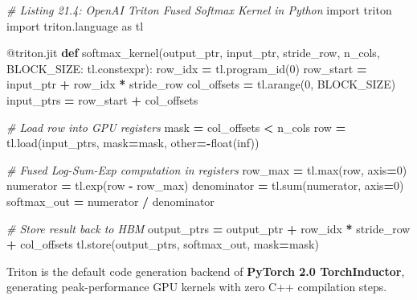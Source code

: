 \documentclass[
  letterpaper,
]{scrbook}
\newenvironment{Shaded}{\begin{snugshade}}{\end{snugshade}}
\newcommand{\AttributeTok}[1]{\textcolor[rgb]{0.13,0.29,0.53}{#1}}
\newcommand{\BuiltInTok}[1]{#1}
\newcommand{\CommentTok}[1]{\textcolor[rgb]{0.56,0.35,0.01}{\textit{#1}}}
\newcommand{\DecValTok}[1]{\textcolor[rgb]{0.00,0.00,0.81}{#1}}
\newcommand{\ImportTok}[1]{#1}
\newcommand{\KeywordTok}[1]{\textcolor[rgb]{0.13,0.29,0.53}{\textbf{#1}}}
\newcommand{\NormalTok}[1]{#1}
\newcommand{\OperatorTok}[1]{\textcolor[rgb]{0.81,0.36,0.00}{\textbf{#1}}}
\newcommand{\StringTok}[1]{\textcolor[rgb]{0.31,0.60,0.02}{#1}}
\begin{document}
\begin{Shaded}
\begin{Highlighting}[]
\CommentTok{\# Listing 21.4: OpenAI Triton Fused Softmax Kernel in Python}
\ImportTok{import}\NormalTok{ triton}
\ImportTok{import}\NormalTok{ triton.language }\ImportTok{as}\NormalTok{ tl}

\AttributeTok{@triton.jit}
\KeywordTok{def}\NormalTok{ softmax\_kernel(output\_ptr, input\_ptr, stride\_row, n\_cols, BLOCK\_SIZE: tl.constexpr):}
\NormalTok{    row\_idx }\OperatorTok{=}\NormalTok{ tl.program\_id(}\DecValTok{0}\NormalTok{)}
\NormalTok{    row\_start }\OperatorTok{=}\NormalTok{ input\_ptr }\OperatorTok{+}\NormalTok{ row\_idx }\OperatorTok{*}\NormalTok{ stride\_row}
\NormalTok{    col\_offsets }\OperatorTok{=}\NormalTok{ tl.arange(}\DecValTok{0}\NormalTok{, BLOCK\_SIZE)}
\NormalTok{    input\_ptrs }\OperatorTok{=}\NormalTok{ row\_start }\OperatorTok{+}\NormalTok{ col\_offsets}

    \CommentTok{\# Load row into GPU registers}
\NormalTok{    mask }\OperatorTok{=}\NormalTok{ col\_offsets }\OperatorTok{\textless{}}\NormalTok{ n\_cols}
\NormalTok{    row }\OperatorTok{=}\NormalTok{ tl.load(input\_ptrs, mask}\OperatorTok{=}\NormalTok{mask, other}\OperatorTok{={-}}\BuiltInTok{float}\NormalTok{(}\StringTok{\textquotesingle{}inf\textquotesingle{}}\NormalTok{))}

    \CommentTok{\# Fused Log{-}Sum{-}Exp computation in registers}
\NormalTok{    row\_max }\OperatorTok{=}\NormalTok{ tl.}\BuiltInTok{max}\NormalTok{(row, axis}\OperatorTok{=}\DecValTok{0}\NormalTok{)}
\NormalTok{    numerator }\OperatorTok{=}\NormalTok{ tl.exp(row }\OperatorTok{{-}}\NormalTok{ row\_max)}
\NormalTok{    denominator }\OperatorTok{=}\NormalTok{ tl.}\BuiltInTok{sum}\NormalTok{(numerator, axis}\OperatorTok{=}\DecValTok{0}\NormalTok{)}
\NormalTok{    softmax\_out }\OperatorTok{=}\NormalTok{ numerator }\OperatorTok{/}\NormalTok{ denominator}

    \CommentTok{\# Store result back to HBM}
\NormalTok{    output\_ptrs }\OperatorTok{=}\NormalTok{ output\_ptr }\OperatorTok{+}\NormalTok{ row\_idx }\OperatorTok{*}\NormalTok{ stride\_row }\OperatorTok{+}\NormalTok{ col\_offsets}
\NormalTok{    tl.store(output\_ptrs, softmax\_out, mask}\OperatorTok{=}\NormalTok{mask)}
\end{Highlighting}
\end{Shaded}

Triton is the default code generation backend of \textbf{PyTorch 2.0
TorchInductor}, generating peak-performance GPU kernels with zero C++
compilation steps.
\end{document}
